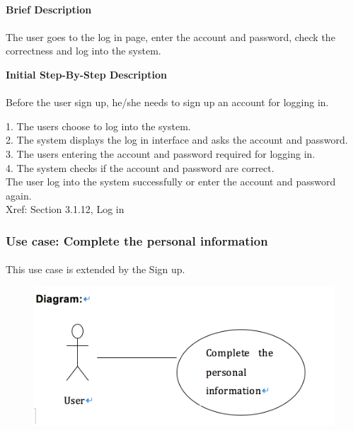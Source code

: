 \documentclass[12pt]{report}
\begin{document}
\paragraph{}
\begin{flushleft}
\textbf{Brief Description }
\paragraph{}
The user goes to the log in page, enter the account and password, check the correctness and log into the system. \\

\begin{flushleft}
\textbf{Initial Step-By-Step Description }
\paragraph{}
Before the user sign up, he/she needs to sign up an account for logging in.

\begin{flushleft}
1.	The users choose to log into the system. \\
2.	The system displays the log in interface and asks the account and password. \\
3.	The users entering the account and password required for logging in. \\
4.	The system checks if the account and password are correct. \\
The user log into the system successfully or enter the account and password again. \\
Xref: Section 3.1.12, Log in

\end{flushleft}
\end{flushleft}
\end{flushleft}


\newpage
\subsubsection{Use case:  Complete the personal information}
\paragraph{}
This use case is extended by the Sign up.
\begin{figure}[!htb]
  \includegraphics{13.PNG}
\end{figure}
\end{document}
